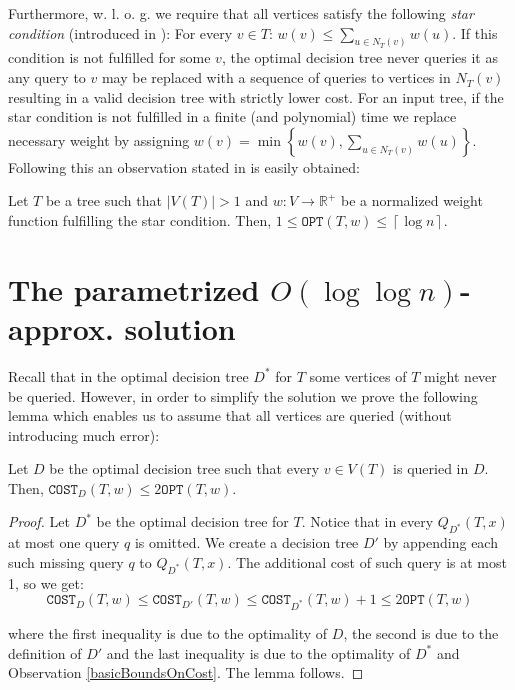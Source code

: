 \documentclass[a4paper, anonymous, numberwithinsect, pdfa, UKenglish,cleveref, autoref, thm-restate]{socg-lipics-v2021}
\newcommand{\br}[1]{\left( #1 \right)}
\newcommand{\brc}[1]{\left\{ #1 \right\}}
\newcommand{\spr}[1]{\left| #1 \right|}
\newcommand{\cl}[1]{\left\lceil #1 \right\rceil}
\newcommand{\OPT}{\texttt{OPT}}
\newcommand{\COST}{\texttt{COST}}
\begin{document}
Furthermore, w. l. o. g. we require that all vertices satisfy the following \textit{star condition} (introduced in \cite{dereniowski2017ApproxSsForGeneralBSinWTs}): For every $v\in T$:
$
w(v) \leq \sum_{u\in N_T(v)}w(u)
$. If this condition is not fulfilled for some $v$, the optimal decision tree never queries it as any query to $v$ may be replaced with a sequence of queries to vertices in $N_T\br{v}$ resulting in a valid decision tree with strictly lower cost. For an input tree, if the star condition is not fulfilled in a finite (and polynomial) time we replace necessary weight by assigning $w(v)=\min\brc{w(v), \sum_{u\in N_T(v)}w(u)}$. Following this an observation stated in \cite{dereniowski2017ApproxSsForGeneralBSinWTs} is easily obtained:
\begin{observation}\label{basicBoundsOnCost}
    Let $T$ be a tree such that $\spr{V\br{T}}> 1$ and $w:V\to \mathbb{R}^+$ be a normalized weight function fulfilling the star condition. Then, $1\leq \OPT(T, w) \leq \cl{\log n}$.
\end{observation}

\section{The parametrized $O\br{\log\log n}$-approx. solution}\label{parametrizedSolution}

Recall that in the optimal decision tree $D^*$ for $T$ some vertices of $T$ might never be queried. However, in order to simplify the solution we prove the following lemma which enables us to assume that all vertices are queried (without introducing much error):
\begin{lemma}\label{fullTreeLemma}
    Let $D$ be the optimal decision tree such that every $v\in V\br{T}$ is queried in $D$. Then, $\COST_D\br{T,w}\leq 2\OPT\br{T,w}$.
    \begin{proof}
         Let $D^*$ be the optimal decision tree for $T$. Notice that in every $Q_{D^*}\br{T, x}$ at most one query $q$ is omitted. We create a decision tree $D'$ by appending each such missing query $q$ to $Q_{D^*}\br{T, x}$. The additional cost of such query is at most 1, so we get:
        $$
        \COST_D\br{T,w}\leq \COST_{D'}\br{T,w}\leq\COST_{D^*}\br{T,w}+1\leq 2\OPT\br{T,w}
        $$
        
        where the first inequality is due to the optimality of $D$, the second is due to the definition of $D'$ and the last inequality is due to the optimality of $D^*$ and Observation \ref{basicBoundsOnCost}. The lemma follows.
    \end{proof}
\end{lemma}
\end{document}
